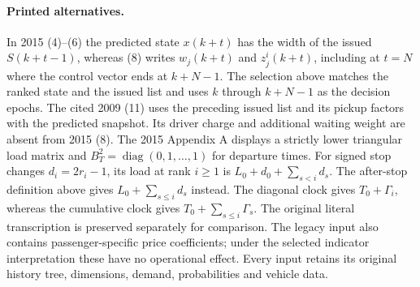 \documentclass{article}
\begin{document}
\paragraph{Printed alternatives.}
In 2015 (4)--(6) the predicted state $x(k+t)$ has the width of the issued
$S(k+t-1)$, whereas (8) writes $w_j(k+t)$ and $z_j^i(k+t)$, including at
$t=N$ where the control vector ends at $k+N-1$. The selection above
matches the ranked state and the issued list and uses $k$ through $k+N-1$
as the decision epochs. The cited 2009 (11) uses the preceding issued
list and its pickup factors with the predicted snapshot. Its driver charge
and additional waiting weight are absent from 2015 (8). The 2015
Appendix A displays a strictly lower triangular load matrix and
$B_T^2=\operatorname{diag}(0,1,\ldots,1)$ for departure times.
For signed stop changes $d_i=2r_i-1$, its load at rank $i\geq1$ is
$L_0+d_0+\sum_{s<i}d_s$. The after-stop definition above gives
$L_0+\sum_{s\leq i}d_s$ instead. The diagonal clock gives $T_0+\Gamma_i$,
whereas the cumulative clock gives $T_0+\sum_{s\leq i}\Gamma_s$.
The original literal transcription is preserved separately for comparison.
The legacy input also contains passenger-specific price coefficients;
under the selected indicator interpretation these have no operational
effect. Every input retains its original history tree, dimensions, demand,
probabilities and vehicle data.
\end{document}
